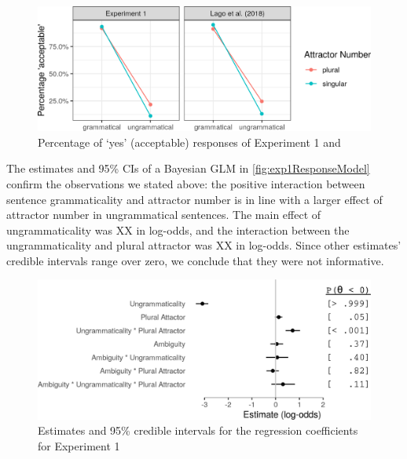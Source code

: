 \documentclass[a4paper,man,natbib]{apa6}\usepackage[]{graphicx}\usepackage[]{color}
\begin{document}
\begin{figure}[h]
\centering
\includegraphics[width=\textwidth]{figures/exp1AvgResponse-1.png}
\caption{Percentage of ‘yes’ (acceptable) responses of Experiment 1 and \citet{LagoEtAl:2018}}
\label{fig:exp1AvgResponse}
\end{figure}


The estimates and 95\% CIs of a Bayesian GLM in \autoref{fig:exp1ResponseModel} confirm the observations we stated above: the positive interaction between sentence grammaticality and attractor number is in line with a larger effect of attractor number in ungrammatical sentences. The main effect of ungrammaticality was XX in log-odds, and the interaction between the ungrammaticality and plural attractor was XX in log-odds. Since other estimates' credible intervals range over zero, we conclude that they were not informative. %



\begin{figure}[h]
\centering
\includegraphics[width=\textwidth]{figures/exp1ResponseModelPlot-1.png}
\caption{Estimates and 95\% credible intervals for the regression coefficients for Experiment 1}
\label{fig:exp1ResponseModel}
\end{figure}
\end{document}
